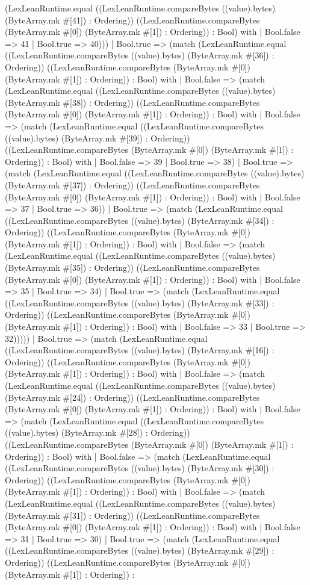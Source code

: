 \documentclass[11pt]{article}
\begin{document}
(LexLeanRuntime.equal ((LexLeanRuntime.compareBytes ((value).bytes) (ByteArray.mk \#[41]) : Ordering)) ((LexLeanRuntime.compareBytes (ByteArray.mk \#[0]) (ByteArray.mk \#[1]) : Ordering)) : Bool) with | Bool.false => 41 | Bool.true => 40))) | Bool.true => (match (LexLeanRuntime.equal ((LexLeanRuntime.compareBytes ((value).bytes) (ByteArray.mk \#[36]) : Ordering)) ((LexLeanRuntime.compareBytes (ByteArray.mk \#[0]) (ByteArray.mk \#[1]) : Ordering)) : Bool) with | Bool.false => (match (LexLeanRuntime.equal ((LexLeanRuntime.compareBytes ((value).bytes) (ByteArray.mk \#[38]) : Ordering)) ((LexLeanRuntime.compareBytes (ByteArray.mk \#[0]) (ByteArray.mk \#[1]) : Ordering)) : Bool) with | Bool.false => (match (LexLeanRuntime.equal ((LexLeanRuntime.compareBytes ((value).bytes) (ByteArray.mk \#[39]) : Ordering)) ((LexLeanRuntime.compareBytes (ByteArray.mk \#[0]) (ByteArray.mk \#[1]) : Ordering)) : Bool) with | Bool.false => 39 | Bool.true => 38) | Bool.true => (match (LexLeanRuntime.equal ((LexLeanRuntime.compareBytes ((value).bytes) (ByteArray.mk \#[37]) : Ordering)) ((LexLeanRuntime.compareBytes (ByteArray.mk \#[0]) (ByteArray.mk \#[1]) : Ordering)) : Bool) with | Bool.false => 37 | Bool.true => 36)) | Bool.true => (match (LexLeanRuntime.equal ((LexLeanRuntime.compareBytes ((value).bytes) (ByteArray.mk \#[34]) : Ordering)) ((LexLeanRuntime.compareBytes (ByteArray.mk \#[0]) (ByteArray.mk \#[1]) : Ordering)) : Bool) with | Bool.false => (match (LexLeanRuntime.equal ((LexLeanRuntime.compareBytes ((value).bytes) (ByteArray.mk \#[35]) : Ordering)) ((LexLeanRuntime.compareBytes (ByteArray.mk \#[0]) (ByteArray.mk \#[1]) : Ordering)) : Bool) with | Bool.false => 35 | Bool.true => 34) | Bool.true => (match (LexLeanRuntime.equal ((LexLeanRuntime.compareBytes ((value).bytes) (ByteArray.mk \#[33]) : Ordering)) ((LexLeanRuntime.compareBytes (ByteArray.mk \#[0]) (ByteArray.mk \#[1]) : Ordering)) : Bool) with | Bool.false => 33 | Bool.true => 32))))) | Bool.true => (match (LexLeanRuntime.equal ((LexLeanRuntime.compareBytes ((value).bytes) (ByteArray.mk \#[16]) : Ordering)) ((LexLeanRuntime.compareBytes (ByteArray.mk \#[0]) (ByteArray.mk \#[1]) : Ordering)) : Bool) with | Bool.false => (match (LexLeanRuntime.equal ((LexLeanRuntime.compareBytes ((value).bytes) (ByteArray.mk \#[24]) : Ordering)) ((LexLeanRuntime.compareBytes (ByteArray.mk \#[0]) (ByteArray.mk \#[1]) : Ordering)) : Bool) with | Bool.false => (match (LexLeanRuntime.equal ((LexLeanRuntime.compareBytes ((value).bytes) (ByteArray.mk \#[28]) : Ordering)) ((LexLeanRuntime.compareBytes (ByteArray.mk \#[0]) (ByteArray.mk \#[1]) : Ordering)) : Bool) with | Bool.false => (match (LexLeanRuntime.equal ((LexLeanRuntime.compareBytes ((value).bytes) (ByteArray.mk \#[30]) : Ordering)) ((LexLeanRuntime.compareBytes (ByteArray.mk \#[0]) (ByteArray.mk \#[1]) : Ordering)) : Bool) with | Bool.false => (match (LexLeanRuntime.equal ((LexLeanRuntime.compareBytes ((value).bytes) (ByteArray.mk \#[31]) : Ordering)) ((LexLeanRuntime.compareBytes (ByteArray.mk \#[0]) (ByteArray.mk \#[1]) : Ordering)) : Bool) with | Bool.false => 31 | Bool.true => 30) | Bool.true => (match (LexLeanRuntime.equal ((LexLeanRuntime.compareBytes ((value).bytes) (ByteArray.mk \#[29]) : Ordering)) ((LexLeanRuntime.compareBytes (ByteArray.mk \#[0]) (ByteArray.mk \#[1]) : Ordering)) : 
\end{document}
